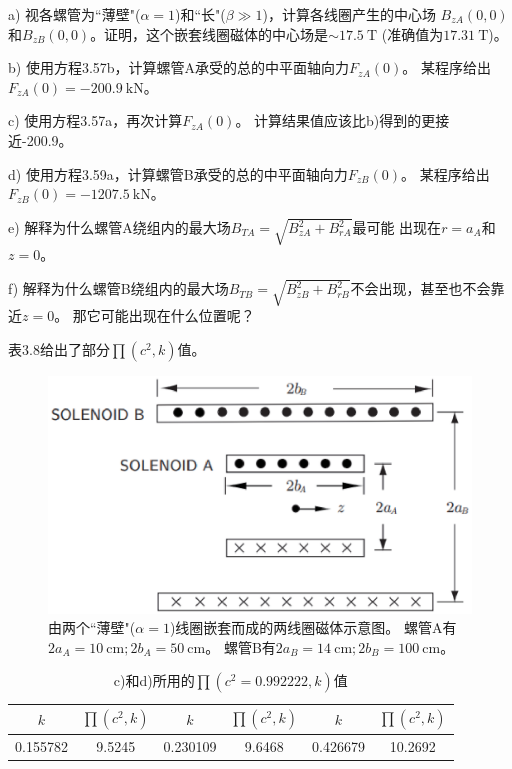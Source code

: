 a) 视各螺管为``薄壁"($\alpha = 1$)和``长"($\beta\gg 1$)，计算各线圈产生的中心场
$B_{zA}(0, 0)$和$B_{zB}(0, 0)$。证明，这个嵌套线圈磁体的中心场是$\sim 17.5\ \mathrm{T}$
(准确值为$17.31\ \mathrm{T}$)。

b) 使用方程3.57b，计算螺管A承受的总的中平面轴向力$F_{zA}(0)$。
某程序给出$F_{zA}(0)=-200.9\ \mathrm{kN}$。

c) 使用方程3.57a，再次计算$F_{zA}(0)$。
计算结果值应该比b)得到的更接近-200.9。

d) 使用方程3.59a，计算螺管B承受的总的中平面轴向力$F_{zB}(0)$。
某程序给出$F_{zB}(0)=-1207.5\ \mathrm{kN}$。

e) 解释为什么螺管A绕组内的最大场$B_{TA}=\sqrt{B_{zA}^2 + B_{rA}^2}$最可能
	出现在$r=a_A$和$z=0$。
	
f) 解释为什么螺管B绕组内的最大场$B_{TB}=\sqrt{B_{zB}^2 + B_{rB}^2}$不会出现，甚至也不会靠近$z=0$。
那它可能出现在什么位置呢？

表3.8给出了部分$\prod(c^2,k)$值。

\begin{figure}[htbp]
	\centering
	\includegraphics[scale=0.5]{chpt3/figs/fig3.44.eps}
	\caption{由两个``薄壁"($\alpha = 1$)线圈嵌套而成的两线圈磁体示意图。
		螺管A有$2a_A=10\ \mathrm{cm};2b_A = 50\ \mathrm{cm}$。
		螺管B有$2a_B = 14\ \mathrm{cm}; 2b_B = 100\ \mathrm{cm}$。}
\end{figure}

\begin{table}[htbp]\small
\centering
\caption{c)和d)所用的$\prod(c^2=0.992222,k)$值}
	\begin{tabular}{|c|c|c|c|c|c|}
		\hline
		$k$  &$\prod(c^2,k)$      &$k$       & $\prod(c^2,k) $    &$k$       &$ \prod(c^2,k) $      \\ \hline\hline
		0.155782 & 9.5245 & 0.230109 & 9.6468 & 0.426679 & 10.2692 \\ \hline
	\end{tabular}
\end{table}


